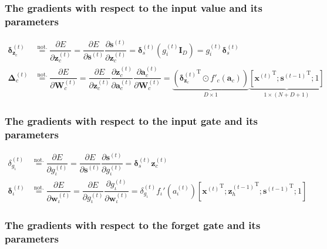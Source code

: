 \documentclass[11pt]{article}
\begin{document}
\subsubsection*{The gradients with respect to the input value and its
  parameters}

\begin{align}
  \boldsymbol{\delta}_{\mathbf{z}_c}^{(t)}
  & \overset{\text{not.}}{=}
    \dfrac{\partial E}{\partial \mathbf{z}_c^{(t)}} =
    \dfrac{\partial E}{\partial \mathbf{s}^{(t)}}
    \dfrac{\partial \mathbf{s}^{(t)}}{\partial \mathbf{z}_c^{(t)}} =
    \boldsymbol{\delta}_s^{(t)} \left(g_i^{(t)}\mathbf{I}_{D}\right)  =
     g_i^{(t)} \boldsymbol{\delta}_s^{(t)}
  \\
  \boldsymbol{\Delta}_{c}^{(t)}
  & \overset{\text{not.}}{=}
    \dfrac{\partial E}{\partial \mathbf{W}_{c}^{(t)}} =
    \dfrac{\partial E}{\partial \mathbf{z}_c^{(t)}}
    \dfrac{\partial \mathbf{z}_c^{(t)}}{\partial \mathbf{a}_c^{(t)}}
    \dfrac{\partial \mathbf{a}_c^{(t)}}{\partial \mathbf{W}_c^{(t)}} =
    \underbrace{\left({\boldsymbol{\delta}_{\mathbf{z}_c}^{(t)}}^{\text{T}} \odot f'_c\left(\mathbf{a}_c\right)\right)}_{D\times 1} \underbrace{\left[{\mathbf{x}^{(t)}}^{\text{T}}; {\mathbf{s}^{(t-1)}}^{\text{T}}; 1\right]}_{1 \times (N+D+1)}
\end{align}

\subsubsection*{The gradients with respect to the input gate and its parameters}

\begin{align}
  \delta_{g_{\iota}}^{(t)}
  & \overset{\text{not.}}{=}
    \dfrac{\partial E}{\partial g_{\iota}^{(t)}} =
    \dfrac{\partial E}{\partial \mathbf{s}^{(t)}}
    \dfrac{\partial \mathbf{s}^{(t)}}{\partial g_{\iota}^{(t)}} =
    \boldsymbol{\delta}_s^{(t)} \mathbf{z}_c^{(t)}
  \\
  \boldsymbol{\delta}_{\iota}^{(t)} &\overset{\text{not.}}{=} \dfrac{\partial E}{\partial \mathbf{w}_{\iota}^{(t)}} = \dfrac{\partial E}{\partial g_{\iota}^{(t)}} \dfrac{\partial g_{\iota}^{(t)}}{\partial \mathbf{w}_{\iota}^{(t)}} = \delta_{g_{\iota}}^{(t)} f_{\iota}'\left(a_{\iota}^{(t)}\right) \left[{\mathbf{x}^{(t)}}^{\text{T}}; {\mathbf{z}_{h}^{(t-1)}}^{\text{T}}; {\mathbf{s}^{(t-1)}}^{\text{T}}; 1\right]
\end{align}

\subsubsection*{The gradients with respect to the forget gate and its parameters}
\end{document}
